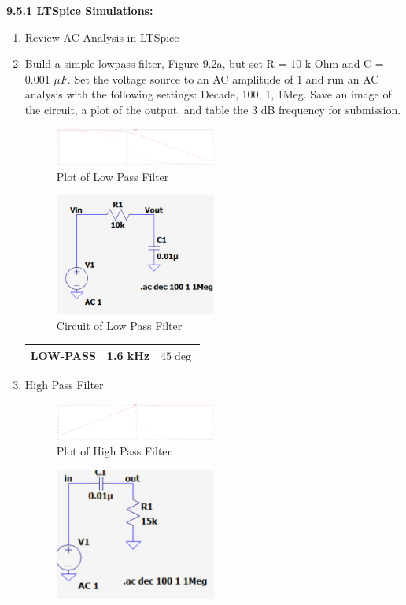 \documentclass{article}
\begin{document}
\textbf{9.5.1 LTSpice Simulations:}
\begin{enumerate}
    \item Review AC Analysis in LTSpice
    \item Build a simple lowpass filter, Figure 9.2a, but set R = 10 k Ohm and C =
    0.001 $\mu F$. Set the voltage source to an AC amplitude of 1 and run an AC
    analysis with the following settings: Decade, 100, 1, 1Meg. Save an image of
    the circuit, a plot of the output, and table the 3 dB frequency for submission.
    \begin{figure}[H]
        \centering
        \includegraphics[width=0.5\textwidth]{2simPlot.png}
        \caption{Plot of Low Pass Filter}
    \end{figure}
    \begin{figure}[H]
        \centering
        \includegraphics[width=0.5\textwidth]{2simCircuit.png}
        \caption{Circuit of Low Pass Filter}
    \end{figure}
    \begin{tabular}{|c|c|c|}
        \hline
        LOW-PASS & 1.6 kHz & $45\deg$ \\
        \hline
        \end{tabular}
    \item High Pass Filter
    \begin{figure}[H]
        \centering
        \includegraphics[width=0.5\textwidth]{3simPlot.png}
        \caption{Plot of High Pass Filter}
    \end{figure}
    \begin{figure}[H]
        \centering
        \includegraphics[width=0.5\textwidth]{3simCircuit.png}

\end{figure}
\end{enumerate}
\end{document}
